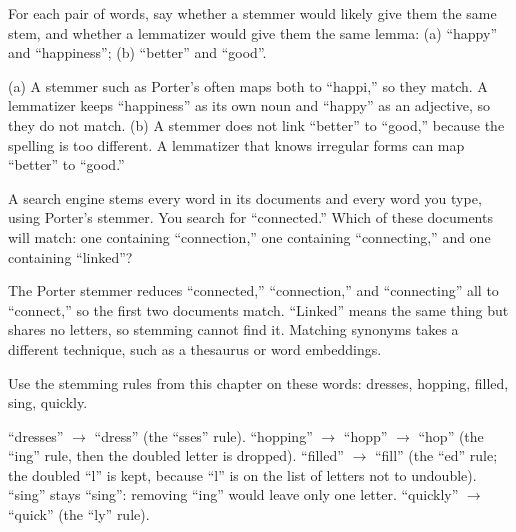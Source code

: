 \begin{Exercise}[label=stem1, title=Stem or lemma?]
For each pair of words, say whether a stemmer would likely give them the same stem, and whether a lemmatizer
would give them the same lemma: (a) ``happy'' and ``happiness''; (b) ``better'' and ``good''.
\end{Exercise}
\begin{Answer}[ref=stem1]
(a) A stemmer such as Porter's often maps both to ``happi,'' so they match. A lemmatizer keeps ``happiness'' as
its own noun and ``happy'' as an adjective, so they do not match. (b) A stemmer does not link ``better'' to
``good,'' because the spelling is too different. A lemmatizer that knows irregular forms can map ``better'' to
``good.''
\end{Answer}

\begin{Exercise}[label=stem2, title=Search Results]
A search engine stems every word in its documents and every word you type, using Porter's stemmer. You search
for ``connected.'' Which of these documents will match: one containing ``connection,'' one containing
``connecting,'' and one containing ``linked''?
\end{Exercise}
\begin{Answer}[ref=stem2]
The Porter stemmer reduces ``connected,'' ``connection,'' and ``connecting'' all to ``connect,'' so the first two
documents match. ``Linked'' means the same thing but shares no letters, so stemming cannot find it. Matching
synonyms takes a different technique, such as a thesaurus or word embeddings.
\end{Answer}

\begin{Exercise}[label=stem3, title={Run the stemmer by hand}]
Use the stemming rules from this chapter on these words: dresses, hopping, filled, sing, quickly.
\end{Exercise}
\begin{Answer}[ref=stem3]
``dresses'' $\to$ ``dress'' (the ``sses'' rule). ``hopping'' $\to$ ``hopp'' $\to$ ``hop'' (the ``ing'' rule, then
the doubled letter is dropped). ``filled'' $\to$ ``fill'' (the ``ed'' rule; the doubled ``l'' is kept, because
``l'' is on the list of letters not to undouble). ``sing'' stays ``sing'': removing ``ing'' would leave only one
letter. ``quickly'' $\to$ ``quick'' (the ``ly'' rule).
\end{Answer}

